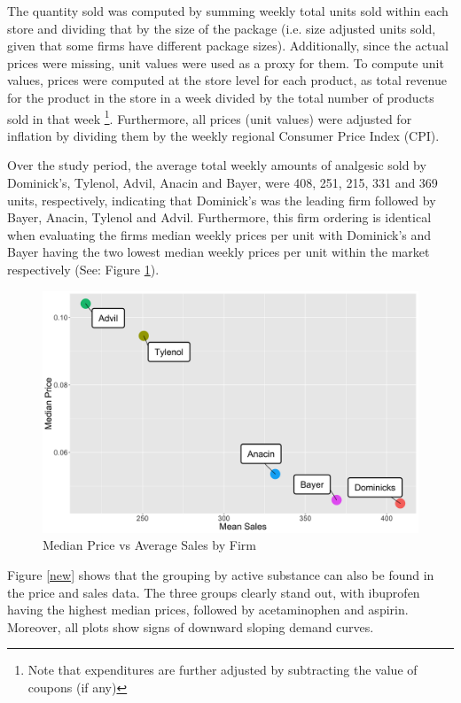 \documentclass[12pt, authoryear]{elsarticle}
\begin{document}
The quantity sold was computed by summing weekly total units sold within each store and dividing that by the size of the package (i.e. size adjusted units sold, given that some firms have different package sizes). Additionally, since the actual prices were missing, unit values were used as a proxy for them. To compute unit values, prices were computed at the store level for each product, as total revenue for the product in the store in a week divided by the total number of products sold in that week \footnote{Note that expenditures are further adjusted by subtracting the value of coupons (if any)}. Furthermore, all prices (unit values) were adjusted for inflation by dividing them by the weekly regional Consumer Price Index (CPI).

Over the study period, the average total weekly amounts of analgesic sold by Dominick's, Tylenol, Advil, Anacin and Bayer, were 408, 251, 215, 331  and 369 units, respectively, indicating that Dominick’s was the leading firm followed by Bayer, Anacin, Tylenol and Advil. Furthermore, this firm ordering is identical when evaluating the firms median weekly prices per unit with Dominick’s  and Bayer having the two lowest median weekly prices per unit  within the market respectively (See: Figure \ref{p_v_s}).

\begin{figure}[H]
	\centering
	\includegraphics[clip, angle=0, width=12cm]{firm_plot.png}
	\caption{ Median Price vs Average Sales by Firm}\label{p_v_s}
\end{figure}

Figure \ref{new} shows that the grouping by active substance can also be found in the price and sales data. The three groups clearly stand out, with ibuprofen having the highest median prices, followed by acetaminophen and aspirin. Moreover, all plots show signs of downward sloping demand curves.
\end{document}
